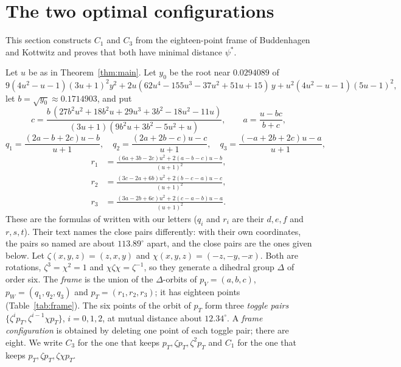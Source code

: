 \documentclass[12pt]{amsart}
\theoremstyle{definition}
\theoremstyle{plain}
\theoremstyle{definition}
\newcommand{\psis}{\psi^{*}}
\newcommand{\CI}{C_1}
\newcommand{\CIII}{C_3}
\begin{document}
\section{The two optimal configurations}\label{sec:optima}

This section constructs $\CI$ and $\CIII$ from the eighteen-point frame of Buddenhagen and Kottwitz \cite[Section~4]{BK} and proves that both have minimal distance $\psis$.

Let $u$ be as in Theorem~\ref{thm:main}. Let $y_0$ be the root near $0.0294089$ of
\[
9(4u^2-u-1)(3u+1)^2y^2+2u(62u^4-155u^3-37u^2+51u+15)\,y+u^2(4u^2-u-1)(5u-1)^2,
\]
let $b=\sqrt{y_0}\approx0.1714903$, and put
\[
c=\frac{b\,(27b^2u^2+18b^2u+29u^3+3b^2-18u^2-11u)}{(3u+1)(9b^2u+3b^2-5u^2+u)},\qquad a=\frac{u-bc}{b+c},
\]
\[
q_1=\frac{(2a-b+2c)u-b}{u+1},\quad q_2=\frac{(2a+2b-c)u-c}{u+1},\quad q_3=\frac{(-a+2b+2c)u-a}{u+1},
\]
\begin{align*}
r_1&=\frac{(6a+3b-2c)u^2+2(a-b-c)u-b}{(u+1)^2},\\
r_2&=\frac{(3c-2a+6b)u^2+2(b-c-a)u-c}{(u+1)^2},\\
r_3&=\frac{(3a-2b+6c)u^2+2(c-a-b)u-a}{(u+1)^2}.
\end{align*}
These are the formulas of \cite[Section~4]{BK} written with our letters ($q_i$ and $r_i$ are their $d,e,f$ and $r,s,t$). Their text names the close pairs differently: with their own coordinates, the pairs so named are about $113.89^\circ$ apart, and the close pairs are the ones given below. Let $\zeta(x,y,z)=(z,x,y)$ and $\chi(x,y,z)=(-z,-y,-x)$. Both are rotations, $\zeta^3=\chi^2=1$ and $\chi\zeta\chi=\zeta^{-1}$, so they generate a dihedral group $\Delta$ of order six. The \emph{frame} is the union of the $\Delta$-orbits of $p_V=(a,b,c)$, $p_W=(q_1,q_2,q_3)$ and $p_T=(r_1,r_2,r_3)$; it has eighteen points (Table~\ref{tab:frame}). The six points of the orbit of $p_T$ form three \emph{toggle pairs} $\{\zeta^ip_T,\zeta^{i-1}\chi p_T\}$, $i=0,1,2$, at mutual distance about $12.34^\circ$. A \emph{frame configuration} is obtained by deleting one point of each toggle pair; there are eight. We write $\CIII$ for the one that keeps $p_T,\zeta p_T,\zeta^2p_T$ and $\CI$ for the one that keeps $p_T,\zeta p_T,\zeta\chi p_T$.
\end{document}
